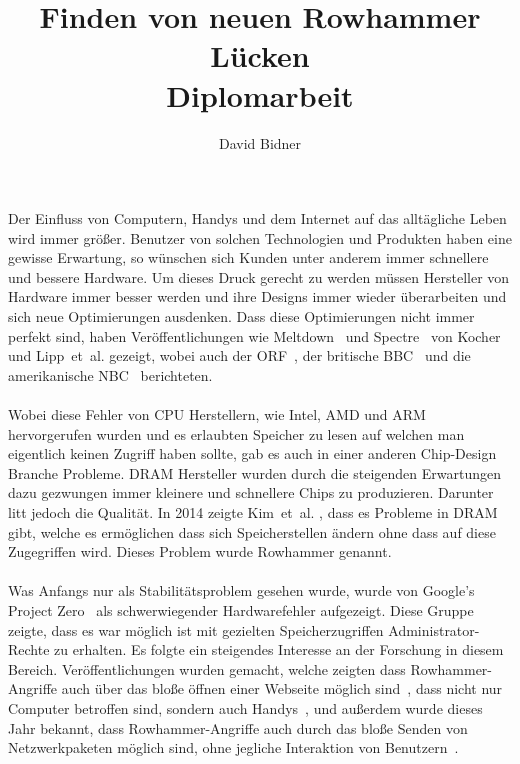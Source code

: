 \documentclass[a4paper]{article}
\title{Finden von neuen Rowhammer Lücken \\ \vspace{+2ex}\small{Diplomarbeit}}
\author{David Bidner}
\date{\vspace{-5ex}}
\newcommand{\etal}{et~al. }
\begin{document}
\maketitle

Der Einfluss von Computern, Handys und dem Internet auf das alltägliche Leben wird immer größer. Benutzer von solchen Technologien und Produkten haben eine gewisse Erwartung, so wünschen sich Kunden unter anderem immer schnellere und bessere Hardware. Um dieses Druck gerecht zu werden müssen Hersteller von Hardware immer besser werden und ihre Designs immer wieder überarbeiten und sich neue Optimierungen ausdenken. Dass diese Optimierungen nicht immer perfekt sind, haben Veröffentlichungen wie Meltdown~\cite{meltdown} und Spectre~\cite{spectre} von Kocher und Lipp~\etal gezeigt, wobei auch der ORF~\cite{orfmeltdown}, der britische BBC~\cite{bbcmeltdown} und die amerikanische NBC~\cite{nbcmeltdown} berichteten.

\paragraph{}

Wobei diese Fehler von CPU Herstellern, wie Intel, AMD und ARM hervorgerufen wurden und es erlaubten Speicher zu lesen auf welchen man eigentlich keinen Zugriff haben sollte, gab es auch in einer anderen Chip-Design Branche Probleme. DRAM Hersteller wurden durch die steigenden Erwartungen dazu gezwungen immer kleinere und schnellere Chips zu produzieren. Darunter litt jedoch die Qualität. In 2014 zeigte Kim~\etal\cite{rowhammergeneral}, dass es Probleme in DRAM gibt, welche es ermöglichen dass sich Speicherstellen ändern ohne dass auf diese Zugegriffen wird. Dieses Problem wurde Rowhammer genannt.

\paragraph{}

Was Anfangs nur als Stabilitätsproblem gesehen wurde, wurde von Google's Project Zero~\cite{projectzerorow} als schwerwiegender Hardwarefehler aufgezeigt. Diese Gruppe zeigte, dass es war möglich ist mit gezielten Speicherzugriffen Administrator-Rechte zu erhalten. Es folgte ein steigendes Interesse an der Forschung in diesem Bereich. Veröffentlichungen wurden gemacht, welche zeigten dass Rowhammer-Angriffe auch über das bloße öffnen einer Webseite möglich sind~\cite{rowhammerjs}, dass nicht nur Computer betroffen sind, sondern auch Handys~\cite{drammer}, und außerdem wurde dieses Jahr bekannt, dass Rowhammer-Angriffe auch durch das bloße Senden von Netzwerkpaketen möglich sind, ohne jegliche Interaktion von Benutzern~\cite{nethammer}.
\end{document}
